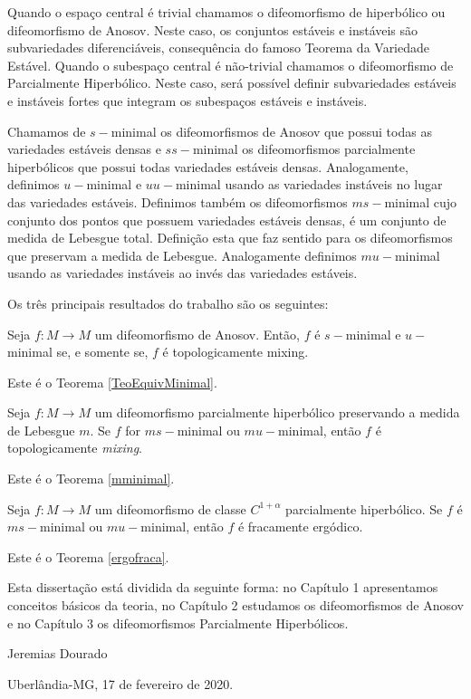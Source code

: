 Quando o espaço central é trivial chamamos o difeomorfismo de hiperbólico ou difeomorfismo de Anosov. Neste caso, os conjuntos estáveis e instáveis são subvariedades diferenciáveis, consequência do famoso Teorema da Variedade Estável. Quando o subespaço central é não-trivial chamamos o difeomorfismo de Parcialmente Hiperbólico. Neste caso, será possível definir subvariedades estáveis e instáveis fortes que integram os subespaços estáveis e instáveis.

Chamamos de $s-$minimal os difeomorfismos de Anosov que possui todas as variedades estáveis densas e $ss-$minimal os difeomorfismos parcialmente hiperbólicos que possui todas variedades estáveis densas. Analogamente, definimos $u-$minimal e $uu-$minimal usando as variedades instáveis no lugar das variedades estáveis. Definimos também os difeomorfismos $ms-$minimal cujo conjunto dos pontos que possuem variedades estáveis densas, é um conjunto de medida de Lebesgue total. Definição esta que faz sentido para os difeomorfismos que preservam a medida de Lebesgue. Analogamente definimos $mu-$minimal usando as variedades instáveis ao invés das variedades estáveis.

Os três principais resultados do trabalho são os seguintes:

\begin{teorema}	
Seja $f : M \to M$ um difeomorfismo de Anosov. Então, $f$ é $s-$minimal e $u-$minimal se, e somente se, $f$ é topologicamente mixing.
\end{teorema}

Este é o Teorema \ref{TeoEquivMinimal}.

\begin{teorema} Seja $f:M\to M$ um difeomorfismo parcialmente hiperbólico preservando a medida de Lebesgue $m$. Se $f$ for $ms-$minimal ou $mu-$minimal, então $f$ é topologicamente \textit{mixing}.
\end{teorema}

Este é o Teorema \ref{mminimal}.

\begin{teorema} Seja $f:M\to M$ um difeomorfismo de classe $C^{1+\alpha}$ parcialmente hiperbólico. Se $f$ é $ms-$minimal ou $mu-$minimal, então $f$ é fracamente ergódico.
\end{teorema}

Este é o Teorema \ref{ergofraca}.

Esta dissertação está dividida da seguinte forma: no Capítulo 1 apresentamos conceitos básicos da teoria, no Capítulo 2 estudamos os difeomorfismos de Anosov e no Capítulo 3 os difeomorfismos Parcialmente Hiperbólicos.

\vspace{2cm}

\hfill Jeremias Dourado

\hfill Uberlândia-MG, 17 de fevereiro de 2020.

%